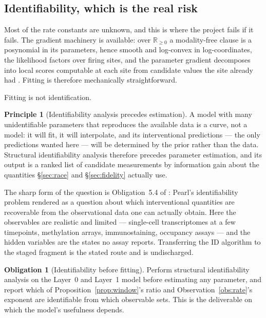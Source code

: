 \documentclass[11pt,a4paper]{article}
\theoremstyle{plain}
\theoremstyle{definition}
\newtheorem{principle}[theorem]{Principle}
\newtheorem{obligation}[theorem]{Obligation}
\theoremstyle{remark}
\newcommand{\Rnn}{\mathbb{R}_{\geq 0}}
\begin{document}
\subsection{Identifiability, which is the real risk}

Most of the rate constants are unknown, and this is where the project fails if
it fails. The gradient machinery is available: over $\Rnn$ a modality-free
clause is a posynomial in its parameters, hence smooth and log-convex in
log-coordinates, the likelihood factors over firing sites, and the parameter
gradient decomposes into local scores computable at each site from candidate
values the site already had \cite{GradedPLN}. Fitting is therefore
mechanically straightforward.

Fitting is not identification.

\begin{principle}[Identifiability analysis precedes estimation]
\label{prin:ident}
A model with many unidentifiable parameters that reproduces the available
data is a curve, not a model: it will fit, it will interpolate, and its
interventional predictions --- the only predictions wanted here --- will be
determined by the prior rather than the data. Structural identifiability
analysis therefore precedes parameter estimation, and its output is a ranked
list of candidate measurements by information gain about the quantities
\S\ref{sec:race} and \S\ref{sec:fidelity} actually use.
\end{principle}

The sharp form of the question is Obligation~5.4 of \cite{Interventions}:
Pearl's identifiability problem rendered as a question about which
interventional quantities are recoverable from the observational data one can
actually obtain. Here the observables are realistic and limited --- single-cell
transcriptomes at a few timepoints, methylation arrays, immunostaining,
occupancy assays --- and the hidden variables are the states no assay reports.
Transferring the ID algorithm \cite{ShpitserPearl} to the staged fragment is
the stated route and is undischarged.

\begin{obligation}[Identifiability before fitting]\label{ob:ident}
Perform structural identifiability analysis on the Layer~0 and Layer~1 model
before estimating any parameter, and report which of
Proposition~\ref{prop:window}'s ratio and Observation~\ref{obs:rate}'s
exponent are identifiable from which observable sets. This is the deliverable
on which the model's usefulness depends.
\end{obligation}
\end{document}
